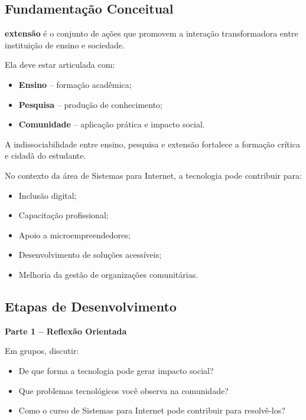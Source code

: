 \documentclass[12pt,a4paper]{article}
\begin{document}
\subsection*{Fundamentação Conceitual}

\textbf{extensão} é o conjunto de ações que promovem a interação transformadora entre instituição de ensino e sociedade.

Ela deve estar articulada com:

\begin{itemize}
    \item \textbf{Ensino} – formação acadêmica;
    \item \textbf{Pesquisa} – produção de conhecimento;
    \item \textbf{Comunidade} – aplicação prática e impacto social.
\end{itemize}

A indissociabilidade entre ensino, pesquisa e extensão fortalece a formação crítica e cidadã do estudante.

No contexto da área de Sistemas para Internet, a tecnologia pode contribuir para:

\begin{itemize}
    \item Inclusão digital;
    \item Capacitação profissional;
    \item Apoio a microempreendedores;
    \item Desenvolvimento de soluções acessíveis;
    \item Melhoria da gestão de organizações comunitárias.
\end{itemize}

\subsection*{Etapas de Desenvolvimento}

\textbf{Parte 1 – Reflexão Orientada}

Em grupos, discutir:

\begin{itemize}
    \item De que forma a tecnologia pode gerar impacto social?
    \item Que problemas tecnológicos você observa na comunidade?
    \item Como o curso de Sistemas para Internet pode contribuir para resolvê-los?
\end{itemize}
\end{document}
